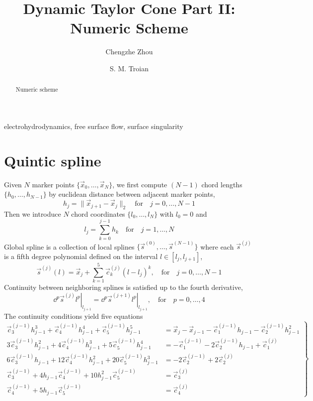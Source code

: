 \documentclass{jfm}
\title{Dynamic Taylor Cone Part II: Numeric Scheme}
\author{ Chengzhe Zhou\aff{1}
 \and S. M. Troian\aff{2}   \corresp{\email{stroian@caltech.edu}}}
\affiliation{\aff{1}Division of Physics, Mathematics and Astronomy, California Institute of Technology,
Pasadena, CA 91125, USA
\aff{2}Department of Applied Physics and Materials Science, 
California Institute of Technology,
Pasadena, CA 91125, USA}
\begin{document}
\maketitle
\tableofcontents
\begin{abstract}
Numeric scheme \citep{Taylor64}
\end{abstract}

\begin{keywords}
electrohydrodynamics, free surface flow, surface singularity 
\end{keywords}

\section{Quintic spline}
Given $N$ marker points $\{\vec{x}_0,\dots,\vec{x}_N\}$,
we first compute $(N-1)$ chord lengths $\{h_0,\dots,h_{N-1}\}$
by euclidean distance between adjacent marker points,
\begin{equation}
h_j=\|\vec{x}_{j+1}-\vec{x}_{j}\|_2\quad\textrm{for}\quad j=0,\dots,N-1
\end{equation}
Then we  introduce $N$ chord coordinates $\{l_0,\dots,l_N\}$ with $l_0=0$ and
\begin{equation}
l_j=\sum_{k=0}^{j-1}h_k\quad\textrm{for}\quad j=1,\dots,N
\end{equation}
Global spline is a collection of local splines $\{\vec{s}^{(0)},\dots,\vec{s}^{(N-1)}\}$
where each $\vec{s}^{(j)}$ is a fifth degree polynomial defined on the interval $l\in[l_j,l_{j+1}]$,
\begin{equation}
\vec{s}^{(j)}(l)=\vec{x}_j+\sum_{k=1}^{5}\vec{c}^{(j)}_k(l-l_j)^k,
\quad\textrm{for}\quad j=0,\dots,N-1
\end{equation}
Continuity between neighboring splines is satisfied up to the fourth derivative,
\begin{equation}
\left.\dd{^{p}\vec{s}^{(j)}}{l^p}\right|_{l_{j+1}}=
\left.\dd{^{p}\vec{s}^{(j+1)}}{l^p}\right|_{l_{j+1}},
\quad\textrm{for}\quad p=0,\dots,4
\end{equation}
The continuity conditions yield five equations
\begin{equation}\left.
\begin{aligned}
\vec{c}^{(j-1)}_3h_{j-1}^3+\vec{c}^{(j-1)}_4h_{j-1}^4+\vec{c}^{(j-1)}_5h_{j-1}^5
&=\vec{x}_j-\vec{x}_{j-1}-\vec{c}^{(j-1)}_1h_{j-1}-\vec{c}^{(j-1)}_2h_{j-1}^2\\
3\vec{c}^{(j-1)}_3h_{j-1}^2+4\vec{c}^{(j-1)}_4h_{j-1}^3+5\vec{c}^{(j-1)}_5h_{j-1}^4
&=-\vec{c}^{(j-1)}_1-2\vec{c}^{(j-1)}_2h_{j-1}+\vec{c}_1^{(j)}\\
6\vec{c}^{(j-1)}_3h_{j-1}+12\vec{c}^{(j-1)}_4h_{j-1}^2+20\vec{c}^{(j-1)}_5h_{j-1}^3
&=-2\vec{c}^{(j-1)}_2+2\vec{c}_2^{(j)}\\
\vec{c}_3^{(j-1)}+4 h_{j-1} \vec{c}_4^{(j-1)}+10 h_{j-1}^2 \vec{c}_5^{(j-1)}
&=\vec{c}_3^{(j)}\\
\vec{c}_4^{(j-1)}+5 h_{j-1} \vec{c}_5^{(j-1)}
&=\vec{c}_4^{(j)}
\end{aligned}\right\}
\end{equation}
\end{document}
